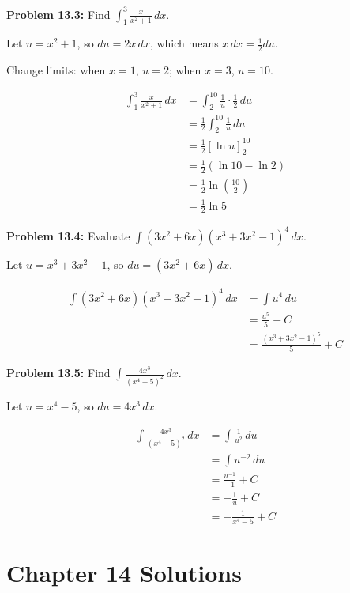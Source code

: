 \documentclass[12pt,a4paper]{book}
\theoremstyle{definition}
\begin{document}
\begin{solution}
\textbf{Problem 13.3:} Find $\int_1^3 \frac{x}{x^2 + 1} \, dx$.

Let $u = x^2 + 1$, so $du = 2x \, dx$, which means $x \, dx = \frac{1}{2} du$.

Change limits: when $x = 1$, $u = 2$; when $x = 3$, $u = 10$.

\begin{align}
\int_1^3 \frac{x}{x^2 + 1} \, dx &= \int_2^{10} \frac{1}{u} \cdot \frac{1}{2} \, du\\
&= \frac{1}{2} \int_2^{10} \frac{1}{u} \, du\\
&= \frac{1}{2} [\ln u]_2^{10}\\
&= \frac{1}{2}(\ln 10 - \ln 2)\\
&= \frac{1}{2}\ln\left(\frac{10}{2}\right)\\
&= \frac{1}{2}\ln 5
\end{align}
\end{solution}

\begin{solution}
\textbf{Problem 13.4:} Evaluate $\int (3x^2 + 6x)(x^3 + 3x^2 - 1)^4 \, dx$.

Let $u = x^3 + 3x^2 - 1$, so $du = (3x^2 + 6x) \, dx$.

\begin{align}
\int (3x^2 + 6x)(x^3 + 3x^2 - 1)^4 \, dx &= \int u^4 \, du\\
&= \frac{u^5}{5} + C\\
&= \frac{(x^3 + 3x^2 - 1)^5}{5} + C
\end{align}
\end{solution}

\begin{solution}
\textbf{Problem 13.5:} Find $\int \frac{4x^3}{(x^4 - 5)^2} \, dx$.

Let $u = x^4 - 5$, so $du = 4x^3 \, dx$.

\begin{align}
\int \frac{4x^3}{(x^4 - 5)^2} \, dx &= \int \frac{1}{u^2} \, du\\
&= \int u^{-2} \, du\\
&= \frac{u^{-1}}{-1} + C\\
&= -\frac{1}{u} + C\\
&= -\frac{1}{x^4 - 5} + C
\end{align}
\end{solution}

\section*{Chapter 14 Solutions}
\end{document}
